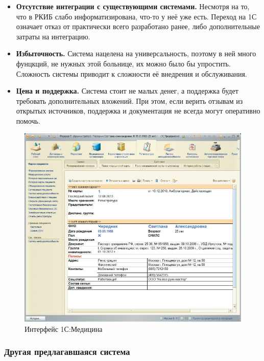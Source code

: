 \documentclass[a4paper,article]{article}
\begin{document}
        \begin{itemize}[nolistsep]
            \item \textbf{Отсутствие интеграции с существующими системами.} Несмотря на то, что в РКИБ слабо информатизирована, что-то у неё уже есть. Переход на 1С означает отказ от практически всего разработано ранее, либо дополнительные затраты на интеграцию.
            \item \textbf{Избыточность.} Система нацелена на универсальность, поэтому в ней много фунцкций, не нужных этой больнице, их можно было бы упростить. Сложность системы приводит к сложности её внедрения и обслуживания.
            \item \textbf{Цена и поддержка.} Система стоит не малых денег, а поддержка будет требовать дополнительных вложений. При этом, если верить отзывам из открытых источников, поддержка и документация не всегда могут оперативно помочь.
        \end{itemize}

        \begin{figure}[h]

            \centering

            \includegraphics[width=0.8\linewidth]{Интерфейс 1С:Медицина.png}

            \caption{\centering Интерфейс 1С:Медицина}

            \label{fig:Интерфейс 1С:Медицина}

        \end{figure}

    \subsubsection{Другая предлагавшаяся система}
\end{document}

